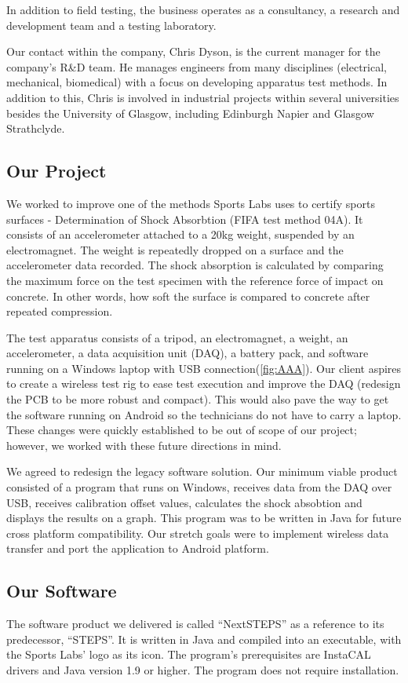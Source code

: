 \documentclass{l3proj}
\begin{document}
In addition to field testing, the business  operates as a consultancy, a research and development team and a testing laboratory.

Our contact within the company, Chris Dyson, is the current manager for the company's R\&D team. He manages engineers from many disciplines (electrical, mechanical, biomedical) with a focus on developing apparatus test methods. In addition to this, Chris is involved in industrial projects within several universities besides the University of Glasgow, including Edinburgh Napier and Glasgow Strathclyde.  
\subsection{Our Project}
We worked to improve one of the methods Sports Labs uses to certify sports surfaces - Determination of Shock Absorbtion (FIFA test method 04A). It consists of an accelerometer attached to a 20kg weight, suspended by an electromagnet. The weight is repeatedly dropped on a surface and the accelerometer data recorded. The shock absorption is calculated by comparing the maximum force on the test specimen with the reference force of impact on concrete\cite{fifa}. In other words, how soft the surface is compared to concrete after repeated compression. 

The test apparatus consists of a tripod, an electromagnet, a weight, an accelerometer, a data acquisition unit (DAQ), a battery pack, and software running on a Windows laptop with USB connection(\ref{fig:AAA}). Our client aspires to create a wireless test rig to ease test execution and improve the DAQ (redesign the PCB to be more robust and compact). This would also pave the way to get the software running on Android so the technicians do not have to carry a laptop. These changes were quickly established to be out of scope of our project; however, we worked with these future directions in mind. 

We agreed to redesign the legacy software solution. Our minimum viable product consisted of a program that runs on Windows, receives data from the DAQ over USB, receives calibration offset values, calculates the shock absobtion and displays the results on a graph. This program was to be written in Java for future cross platform compatibility. Our stretch goals were to implement wireless data transfer and port the application to Android platform.


\subsection{Our Software}
The software product we delivered is called ``NextSTEPS'' as a reference to its predecessor, ``STEPS''. It is written in Java and compiled into an executable, with the Sports Labs' logo as its icon. The program's prerequisites are InstaCAL drivers and Java version 1.9 or higher. The program does not require installation.
\end{document}
